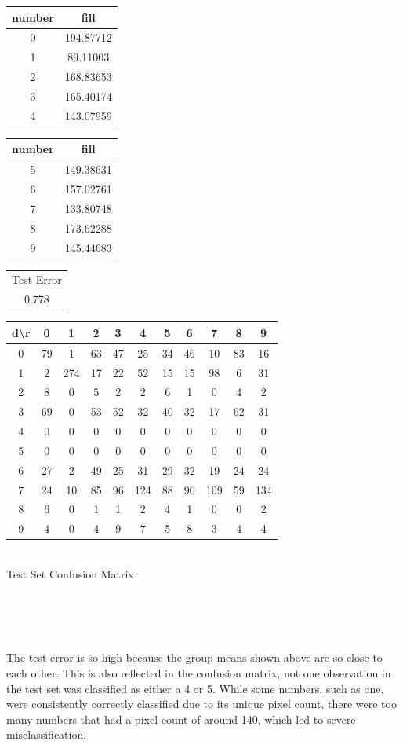 \documentclass[10pt]{extarticle}
\begin{document}
\begin{minipage}{.45\textwidth}
\begin{center}
\begin{minipage}{.45\textwidth}
	\begin{tabular}{c c}
	number & fill\\ \hline
	0& 194.87712\\
	1&  89.11003\\
	2& 168.83653\\
	3& 165.40174\\
	4& 143.07959
	\end{tabular}
\end{minipage}
\begin{minipage}{.45\textwidth}
	\begin{tabular}{c c}
	number & fill\\ \hline
	5& 149.38631\\
	6& 157.02761\\
	7& 133.80748\\
	8& 173.62288\\
	9& 145.44683
	\end{tabular}
\end{minipage}
\begin{tabular}{c}
	Test Error\\
	0.778
\end{tabular}
\end{center}
\end{minipage}
\begin{minipage}{.6\textwidth}
	\begin{center}
	\begin{tabular}{c | c c c c c c c c c c}
	d\textbackslash r&0&1&2&3&4&5&6&7&8&9\\ \hline
	0&79&1&63&47&25&34&46&10&83&16\\
	1&2&274&17&22&52&15&15&98&6&31\\
	2&8&0&5&2&2&6&1&0&4&2\\
	3&69&0&53&52&32&40&32&17&62&31\\
	4&0&0&0&0&0&0&0&0&0&0\\
	5&0&0&0&0&0&0&0&0&0&0\\
	6&27&2&49&25&31&29&32&19&24&24\\
	7&24&10&85&96&124&88&90&109&59&134\\
	8&6&0&1&1&2&4&1&0&0&2\\
	9&4&0&4&9&7&5&8&3&4&4
	\end{tabular}\\
	\bigskip
	Test Set Confusion Matrix
	\end{center}
	\textrm{ }\\
\end{minipage}\\\\
The test error is so high because the group means shown above are so close to each other. This is also reflected in the confusion matrix, not one observation in the test set was classified as either a 4 or 5. While some numbers, such as one, were consistently correctly classified due to its unique pixel count, there were too many numbers that had a pixel count of around 140, which led to severe misclassification.
\end{document}
